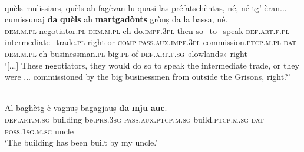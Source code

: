 \ea
\label{ex:pass.dyn7}
\\
\gll [...] quèls mulissiars, quèls ah fagèvan lu quasi las préfatschèntas, né, né tg’ èran... cumissunaj \textbf{da} \textbf{quèls} ah \textbf{martgadònts} grònṣ da la bassa, né.\\
{} \textsc{dem.m.pl} negotiator.\textsc{pl} \textsc{dem.m.pl} eh do.\textsc{impf.3pl} then so\_to\_speak \textsc{def.art.f.pl}  intermediate\_trade.\textsc{pl} right or \textsc{comp} \textsc{pass.aux.impf.3pl} commission.\textsc{ptcp.m.pl} \textsc{dat} \textsc{dem.m.pl} eh businessman.\textsc{pl} big.\textsc{pl} of \textsc{def.art.f.sg} «lowlands» right \\
\glt `[...] These negotiators, they would do so to speak the intermediate trade, or they were ... commissioned by the big businessmen from outside the Grisons, right?'
\z

\ea
\label{ex:pass.dyn8}
\\
\gll Al baghètg è vagnuṣ bagagjauṣ \textbf{da} \textbf{mju} \textbf{auc}.\\
\textsc{def.art.m.sg} building be.\textsc{prs.3sg} \textsc{pass.aux.ptcp.m.sg} build.\textsc{ptcp.m.sg} \textsc{dat} \textsc{poss.1sg.m.sg} uncle\\
\glt `The building has been built by my uncle.'
\z